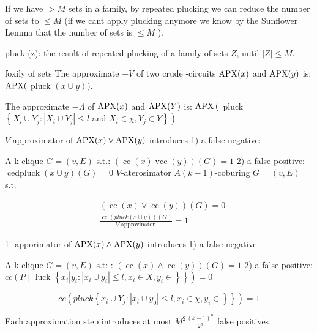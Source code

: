 \begin{corollary}
If we have $>M$ sets in a family, by repeated plucking we can reduce the number of sets to $\leq M$ (if we cant apply plucking anymore we know by the Sunflower Lemma that the number of sets is $\leq M$ ).
\end{corollary}

pluck (z): the result of repeated plucking of a family of sets $Z$, until $|Z| \leq M$.

\begin{definition}
foxily of sets The approximate $-V$ of two crude -circuits $\mathrm{APX}(x)$ and $\operatorname{\mathrm{APX}}(y)$ is: $\operatorname{\mathrm{APX}}($ pluck $(x \cup y))$.

The approximate $-\Lambda$ of $\mathrm{APX}(x)$ and $\mathrm{APX}(Y)$ is: 
$\operatorname{\mathrm{APX}}\left(\right.$ pluck $\left\{X_i \cup Y_j:\left|X_i \cup Y_j\right| \leq l\right.$ and $\left.\left.X_i \in \chi, Y_j \in Y\right\}\right)$
\end{definition}




$V$-approximator of $\operatorname{\mathrm{APX}}(x) \vee \operatorname{\mathrm{APX}}(y)$ introduces
1) a false negative:

A k-clique $G=(v, E)$ s.t.: $(\operatorname{cc}(x) \operatorname{vcc}(y))(G)=1$
2) a false positive:
$\operatorname{cedpluck}(x \cup y)(G)=0$
$V$-aterosimator
$A(k-1)$-coburing $G=(v, E)$ s.t.

$$
\begin{aligned}
& (\operatorname{cc}(x) \vee \operatorname{cc}(y))(G)=0 \\
& \frac{\operatorname{cc}(p l u c k(x \cup y))(G)}{V \text {-approvinator }}=1
\end{aligned}
$$


1 -apporimator of $\operatorname{\mathrm{APX}}(x) \wedge \operatorname{\mathrm{APX}}(y)$ introduces
1) a false negative:

A k-clique $G=(v, E)$ s.t: : $(\operatorname{cc}(x) \wedge \operatorname{cc}(y))(G)=1$
2) a false positive: $c c\left(P \mid\right.$ luck $\left.\left\{x_i\left|y_i:\left|x_i \cup y_i\right| \leq l, x_i \in X, y_i \in\right\}\right\}\right)=0$

$$
\left.c c\left(p l u c k\left\{x_i \cup Y_j:\left|x_i \cup y_0\right| \leq l, x_i \in \chi, y_i \in\right\}\right\}\right)=1
$$


Each approximation step introduces at most $M^2 \frac{(k-1)^n}{2^p}$ false positives.

